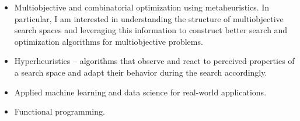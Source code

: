 \documentclass[a4paper,10pt]{cvclean}
\begin{document}
\setmainfont[Mapping=tex-text]{Cambria}
\makeheader


\begin{education}
\begin{degree}
\end{degree}
\begin{degree}
\end{degree}
\begin{degree}
\end{degree}
\end{education}


\begin{Research Interests}
\begin{itemize}
\item Multiobjective and combinatorial optimization using metaheuristics. In
  particular, I am interested in understanding the structure of multiobjective
  search spaces and leveraging this information to construct better search and
  optimization algorithms for multiobjective problems.
\item Hyperheuristics -- algorithms that observe and react to perceived
  properties of a search space and adapt their behavior during the search
  accordingly.
\item Applied machine learning and data science for real-world applications.
\item Functional programming.
\end{itemize}
\end{Research Interests}
\end{document}
